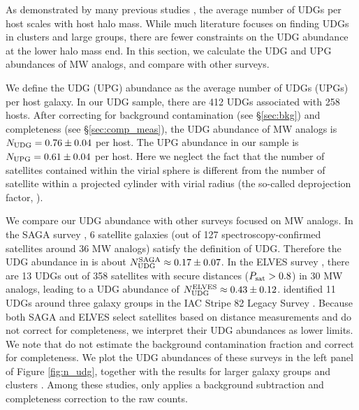 \documentclass[twocolumn,astrosymb,twocolappendix]{aastex631}
\begin{document}
\begin{CJK*}{UTF8}{gbsn}
As demonstrated by many previous studies \citep[e.g.,][]{vdBurg2016,vdBurg2017,Roman2017a,Karunakaran2022b}, the average number of UDGs per host scales with host halo mass. While much literature focuses on finding UDGs in clusters and large groups, there are fewer constraints on the UDG abundance at the lower halo mass end. In this section, we calculate the UDG and UPG abundances of MW analogs, and compare with other surveys.

We define the UDG (UPG) abundance as the average number of UDGs (UPGs) per host galaxy. In our UDG sample, there are 412 UDGs associated with 258 hosts. After correcting for background contamination (see \S \ref{sec:bkg}) and completeness (see \S \ref{sec:comp_meas}), the UDG abundance of MW analogs is $N_{\rm UDG} = 0.76\pm 0.04$ per host. The UPG abundance in our sample is $N_{\rm UPG} = 0.61\pm 0.04$ per host. Here we neglect the fact that the number of satellites contained within the virial sphere is different from the number of satellite within a projected cylinder with virial radius (the so-called deprojection factor, \citealt{vdBurg2017}).


We compare our UDG abundance with other surveys focused on MW analogs. In the SAGA survey \citep{SAGA-II}, 6 satellite galaxies (out of 127 spectroscopy-confirmed satellites around 36 MW analogs) satisfy the definition of UDG. Therefore the UDG abundance in \citet{SAGA-II} is about $N_{\rm UDG}^{\rm SAGA}\approx 0.17\pm0.07$. In the ELVES survey \citep{CarlstenELVES2022}, there are 13 UDGs out of 358 satellites with secure distances ($P_{\rm sat} > 0.8$) in 30 MW analogs, leading to a UDG abundance of $N_{\rm UDG}^{\rm ELVES} \approx 0.43\pm0.12$. \citet{Roman2017b} identified 11 UDGs around three galaxy groups in the IAC Stripe 82 Legacy Survey \citep{Fliri2016}. Because both SAGA and ELVES select satellites based on distance measurements and do not correct for completeness, we interpret their UDG abundances as lower limits. We note that \citet{Roman2017b} do not estimate the background contamination fraction and correct for completeness. We plot the UDG abundances of these surveys in the left panel of Figure \ref{fig:n_udg}, together with the results for larger galaxy groups and clusters \citep{Koda2015,Munoz2015,Roman2017a,Roman2017b,Janssens2017,vdBurg2017}. Among these studies, only \citet{vdBurg2017} applies a background subtraction and completeness correction to the raw counts.



\end{CJK*}
\end{document}

